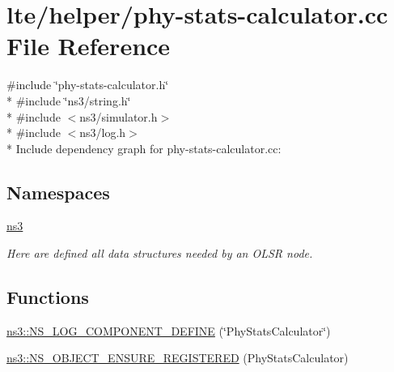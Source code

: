 \hypertarget{phy-stats-calculator_8cc}{}\section{lte/helper/phy-\/stats-\/calculator.cc File Reference}
\label{phy-stats-calculator_8cc}
{\ttfamily \#include \char`\"{}phy-\/stats-\/calculator.\+h\char`\"{}}\\*
{\ttfamily \#include \char`\"{}ns3/string.\+h\char`\"{}}\\*
{\ttfamily \#include $<$ns3/simulator.\+h$>$}\\*
{\ttfamily \#include $<$ns3/log.\+h$>$}\\*
Include dependency graph for phy-\/stats-\/calculator.cc\+:
\subsection*{Namespaces}
\begin{DoxyCompactItemize}
\item 
 \hyperlink{namespacens3}{ns3}
\begin{DoxyCompactList}\small\item\em Here are defined all data structures needed by an O\+L\+SR node. \end{DoxyCompactList}\end{DoxyCompactItemize}
\subsection*{Functions}
\begin{DoxyCompactItemize}
\item 
\hyperlink{namespacens3_ad7228c9b462736ab026f0e5bab313961}{ns3\+::\+N\+S\+\_\+\+L\+O\+G\+\_\+\+C\+O\+M\+P\+O\+N\+E\+N\+T\+\_\+\+D\+E\+F\+I\+NE} (\char`\"{}Phy\+Stats\+Calculator\char`\"{})
\item 
\hyperlink{namespacens3_ada19baeb176bd0b260190b81e647ce7c}{ns3\+::\+N\+S\+\_\+\+O\+B\+J\+E\+C\+T\+\_\+\+E\+N\+S\+U\+R\+E\+\_\+\+R\+E\+G\+I\+S\+T\+E\+R\+ED} (Phy\+Stats\+Calculator)
\end{DoxyCompactItemize}
